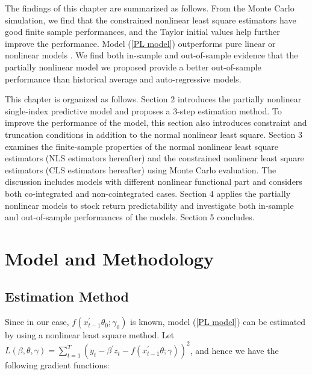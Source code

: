 \documentclass[a4paper,12pt,times,numbered,print,index]{report}
\numberwithin{equation}{section}
\begin{document}


The findings of this chapter are summarized as follows. From the Monte Carlo simulation, we find that the constrained nonlinear least square estimators have good finite sample performances, and the Taylor initial values help further improve the performance. Model (\ref{PL model}) outperforms pure linear or nonlinear models . We find both in-sample and out-of-sample evidence that the partially nonlinear model we proposed provide a better out-of-sample performance than historical average and  auto-regressive models. 

This chapter is organized as follows. Section 2 introduces the partially nonlinear single-index predictive model and proposes a 3-step estimation method. To improve the performance of the model, this section also introduces constraint and truncation conditions in addition to the normal nonlinear least square. Section 3 examines the finite-sample properties of the normal nonlinear least square estimators (NLS estimators hereafter) and the constrained nonlinear least square estimators (CLS estimators hereafter) using Monte Carlo evaluation. The discussion includes models with different nonlinear functional part and considers both co-integrated and non-cointegrated cases. Section 4 applies the partially nonlinear models to stock return predictability and investigate both in-sample and out-of-sample performances of the models. Section 5 concludes. 

%
\section{Model and Methodology}
\subsection{Estimation Method}
Since in our case, $f\left( x_{t-1}^{\prime }\theta_0; \gamma_0\right)$ is known, model (\ref{PL model}) can be estimated by using a nonlinear least square method. Let $L(\beta, \theta, \gamma) = \sum_{t=1}^{T} \left( y_t - \beta^{\prime} z_t - f\left( x_{t-1}^{\prime }\theta; \gamma\right)\right) ^2$, and hence we have the following gradient functions:
\end{document}
